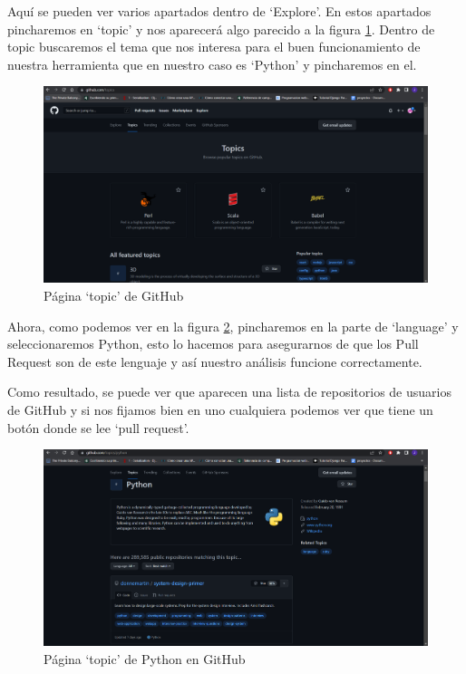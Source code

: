 \documentclass[a4paper, 12pt]{book}
\begin{document}
Aquí se pueden ver varios apartados dentro de `Explore'. En estos apartados pincharemos en `topic' y nos aparecerá algo parecido a la figura \ref{figura:git2}. Dentro de topic buscaremos el tema que nos interesa para el buen funcionamiento de nuestra herramienta que en nuestro caso es `Python' y pincharemos en el.

\begin{figure}
    \includegraphics[bb=0 0 800 600, width=12cm, keepaspectratio]{img/git2}
    \caption{Página `topic' de GitHub}
    \label{figura:git2}
 \end{figure}
 
Ahora, como podemos ver en la figura \ref{figura:git3}, pincharemos en la parte de `language' y seleccionaremos Python, esto lo hacemos para asegurarnos de que los Pull Request son de este lenguaje y así nuestro análisis funcione correctamente.

Como resultado, se puede ver que aparecen una lista de repositorios de usuarios de GitHub y si nos fijamos bien en uno cualquiera podemos ver que tiene un botón donde se lee `pull request'. 

\begin{figure}
    \includegraphics[bb=0 0 800 600, width=12cm, keepaspectratio]{img/git3}
    \caption{Página `topic' de Python en GitHub}
    \label{figura:git3}
 \end{figure}
 
\end{document}
